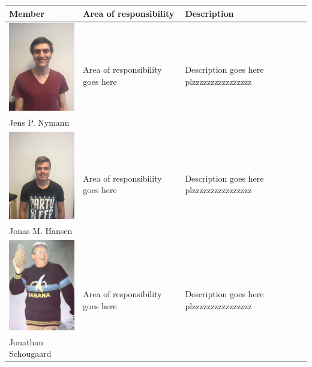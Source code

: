 \begin{tabular}[c]{|p{3cm}| p{5cm} | p{6cm}|}
	\hline
	\textbf{Member} & \textbf{Area of responsibility} & \textbf{Description}\\\hline
	
	\phantom{Test}
	\includegraphics[width=3cm]{Introduction/TeamPictures/Jens} & \multirow{2}{5cm}{Area of responsibility goes here} & \multirow{2}{6cm}{Description goes here plzzzzzzzzzzzzzzzz} \\
	Jens P. Nymann & & \\ \hline
	
	\phantom{Test}
	\includegraphics[width=3cm]{Introduction/TeamPictures/Jonas} & \multirow{2}{5cm}{Area of responsibility goes here} & \multirow{2}{6cm}{Description goes here plzzzzzzzzzzzzzzzz} \\
	Jonas M. Hansen & & \\ \hline
	
	\phantom{Test}
	\includegraphics[width=3cm]{Introduction/TeamPictures/Jonathan} & \multirow{2}{5cm}{Area of responsibility goes here} & \multirow{2}{6cm}{Description goes here plzzzzzzzzzzzzzzzz} \\
	Jonathan Schougaard & & \\ \hline
\end{tabular}

